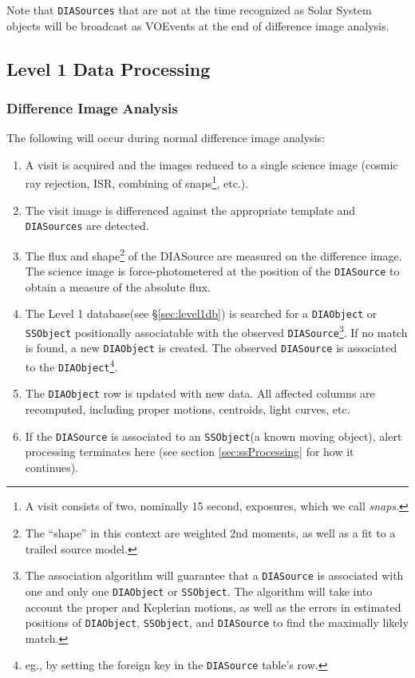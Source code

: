 \documentclass[12pt]{article}
\newcommand{\code}[1]{\texttt{#1}}
\newcommand{\DIASource}{\code{DIASource}\xspace}
\newcommand{\DIASources}{\code{DIASources}\xspace}
\newcommand{\DIAObject}{\code{DIAObject}\xspace}
\newcommand{\DB}{{Level 1 database}\xspace}
\newcommand{\SSObject}{\code{SSObject}\xspace}
\begin{document}
Note that \DIASources that are not at the time recognized as Solar System objects will be broadcast as VOEvents at the end of difference image analysis.

\subsection{Level 1 Data Processing}

\subsubsection{Difference Image Analysis}

The following will occur during normal difference image analysis:
\begin{enumerate}
\item A visit is acquired and the images reduced to a single science image (cosmic ray rejection, ISR, combining of snaps\footnote{A visit consists of two, nominally 15 second, exposures, which we call {\em snaps}.}, etc.).
\item The visit image is differenced against the appropriate template and \DIASources are detected.
\item The flux and shape\footnote{The ``shape'' in this context are weighted 2nd moments, as well as a fit to a trailed source model.} of the DIASource are measured on the difference image. The science image is force-photometered at the position of the \DIASource to obtain a measure of the absolute flux.
\item The \DB (see \S \ref{sec:level1db}) is searched for a \DIAObject or \SSObject positionally associatable with the observed \DIASource\footnote{The association algorithm will guarantee that a \DIASource is associated with one and only one \DIAObject or \SSObject. The algorithm will take into account the proper and Keplerian motions, as well as the errors in estimated positions of \DIAObject, \SSObject, and \DIASource to find the maximally likely match.}. If no match is found, a new \DIAObject is created. The observed \DIASource is associated to the \DIAObject\footnote{eg., by setting the foreign key in the \DIASource table's row.}.
\item The \DIAObject row is updated with new data. All affected columns are recomputed, including proper motions, centroids, light curves, etc.
\item If the \DIASource is associated to an \SSObject (a known moving object), alert processing terminates here (see section \ref{sec:ssProcessing} for how it continues).

\end{enumerate}
\end{document}
